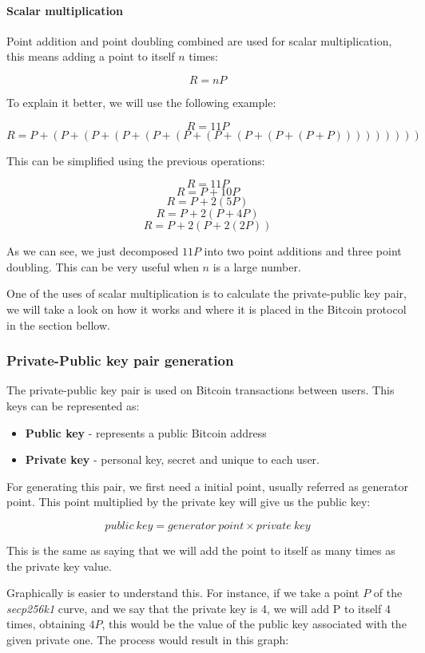 \documentclass{article}
\newcommand\tab[1][1cm]{\hspace*{#1}}
\begin{document}
\paragraph{Scalar multiplication}

\tab Point addition and point doubling combined are used for scalar multiplication, this means adding a point to itself \(n\) times:

\[R = nP\]

To explain it better, we will use the following example:

\[R = 11P\]
\[R = P + (P + (P + (P + (P + (P + (P + (P + (P + (P + P)))))))))\]

This can be simplified using the previous operations:

\[R = 11P\]
\[R = P + 10P\]
\[R = P + 2(5P)\]
\[R = P + 2(P + 4P)\]
\[R = P + 2(P + 2(2P))\]

As we can see, we just decomposed \(11P\) into two point additions and three point doubling. This can be very useful when \(n\) is a large number.

One of the uses of scalar multiplication is to calculate the private-public key pair, we will take a look on how it works and where it is placed in the Bitcoin protocol in the section bellow.

\subsubsection{Private-Public key pair generation}

\tab The private-public key pair is used on Bitcoin transactions between users. This keys can be represented as:

\begin{itemize}
    \item \textbf{Public key} - represents a public Bitcoin address
    \item \textbf{Private key} - personal key, secret and unique to each user.
\end{itemize}

For generating this pair, we first need a initial point, usually referred as generator point. This point multiplied by the private key will give us the public key:

\[public\: key = generator\: point \times private\: key\]

This is the same as saying that we will add the point to itself as many times as the private key value.

Graphically is easier to understand this. For instance, if we take a point \(P\) of the \textit{secp256k1} curve, and we say that the private key is 4, we will add P to itself 4 times, obtaining \(4P\), this would be the value of the public key associated with the given private one. The process would result in this graph:
\end{document}
